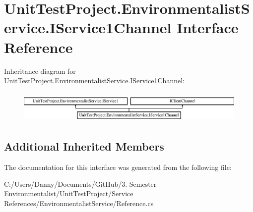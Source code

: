 \hypertarget{interface_unit_test_project_1_1_environmentalist_service_1_1_i_service1_channel}{}\section{Unit\+Test\+Project.\+Environmentalist\+Service.\+I\+Service1\+Channel Interface Reference}
\label{interface_unit_test_project_1_1_environmentalist_service_1_1_i_service1_channel}
Inheritance diagram for Unit\+Test\+Project.\+Environmentalist\+Service.\+I\+Service1\+Channel\+:\begin{figure}[H]
\begin{center}
\leavevmode
\includegraphics[height=1.604584cm]{interface_unit_test_project_1_1_environmentalist_service_1_1_i_service1_channel}
\end{center}
\end{figure}
\subsection*{Additional Inherited Members}


The documentation for this interface was generated from the following file\+:\begin{DoxyCompactItemize}
\item 
C\+:/\+Users/\+Danny/\+Documents/\+Git\+Hub/3.-\/\+Semester-\/\+Environmentalist/\+Unit\+Test\+Project/\+Service References/\+Environmentalist\+Service/Reference.\+cs\end{DoxyCompactItemize}
